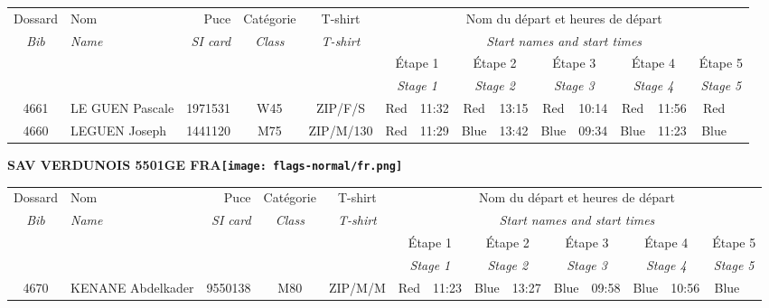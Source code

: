\documentclass{report}
\begin{document}
  \begin{longtable}{|c|l|r|c|c|*{5}{cc|}}
    Dossard & Nom  & Puce    & Catégorie & T-shirt & \multicolumn{10}{c|}{Nom du départ et heures de départ} \\
    \itshape Bib     & \itshape Name & \itshape SI card & \itshape Class  & \itshape  T-shirt  & \multicolumn{10}{c|}{\itshape Start names and start times} \\
    \hline
    & & & & & \multicolumn{2}{c|}{Étape 1} & \multicolumn{2}{c|}{Étape 2} & \multicolumn{2}{c|}{Étape 3} & \multicolumn{2}{c|}{Étape 4} & \multicolumn{2}{c|}{Étape 5} \\
    & & & & & \multicolumn{2}{c|}{\itshape Stage 1} & \multicolumn{2}{c|}{\itshape Stage 2} & \multicolumn{2}{c|}{\itshape Stage 3} & \multicolumn{2}{c|}{\itshape Stage 4} & \multicolumn{2}{c|}{\itshape Stage 5} \\
    \hline
    4661 & LE GUEN Pascale & 1971531 & W45 & ZIP/F/S & Red & 11:32 & Red & 13:15 & Red & 10:14 & Red & 11:56 & Red &  \\
    4660 & LEGUEN Joseph & 1441120 & M75 & ZIP/M/130 & Red & 11:29 & Blue & 13:42 & Blue & 09:34 & Blue & 11:23 & Blue &  \\
  \end{longtable}
\newpage
  \Huge \centering \bfseries SAV VERDUNOIS 5501GE FRA\normalfont \footnotesize \sffamily \hfill \texttt{[image: flags-normal/fr.png]} \newline 
  \begin{longtable}{|c|l|r|c|c|*{5}{cc|}}
    Dossard & Nom  & Puce    & Catégorie & T-shirt & \multicolumn{10}{c|}{Nom du départ et heures de départ} \\
    \itshape Bib     & \itshape Name & \itshape SI card & \itshape Class  & \itshape  T-shirt  & \multicolumn{10}{c|}{\itshape Start names and start times} \\
    \hline
    & & & & & \multicolumn{2}{c|}{Étape 1} & \multicolumn{2}{c|}{Étape 2} & \multicolumn{2}{c|}{Étape 3} & \multicolumn{2}{c|}{Étape 4} & \multicolumn{2}{c|}{Étape 5} \\
    & & & & & \multicolumn{2}{c|}{\itshape Stage 1} & \multicolumn{2}{c|}{\itshape Stage 2} & \multicolumn{2}{c|}{\itshape Stage 3} & \multicolumn{2}{c|}{\itshape Stage 4} & \multicolumn{2}{c|}{\itshape Stage 5} \\
    \hline
    4670 & KENANE Abdelkader & 9550138 & M80 & ZIP/M/M & Red & 11:23 & Blue & 13:27 & Blue & 09:58 & Blue & 10:56 & Blue &  \\
  \end{longtable}
\end{document}
